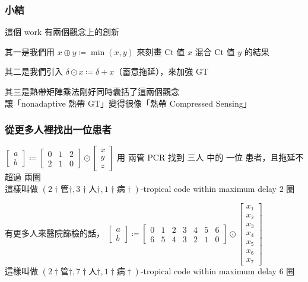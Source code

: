 \documentclass[12pt,aspectratio=1610]{beamer}
\def\pp{\pause\par}
\begin{document}
\begin{frame}\frametitle{小結}
	這個 work 有兩個觀念上的創新
	\pp
	其一是我們用 $x ⊕ y ≔ \min(x, y)$ 來刻畫 Ct 值 $x$ 混合 Ct 值 $y$ 的結果 %
	\pp
	其二是我們引入 $δ ⊙ x ≔ δ + x$（蓄意拖延），來加強 GT %
	\pp
	其三是熱帶矩陣乘法剛好同時囊括了這兩個觀念 \\
	讓「nonadaptive 熱帶 GT」變得很像「熱帶 Compressed Sensing」
\end{frame}

\begin{frame}\frametitle{從更多人裡找出一位患者}
	$\begin{bmatrix}
		a \\ b
	\end{bmatrix}
	≔
	\begin{bmatrix}
		0 & 1 & 2 \\
		2 & 1 & 0
	\end{bmatrix}
	⊙
	\begin{bmatrix}
		x \\ y \\ z
	\end{bmatrix}$
	用 \alert{兩管} PCR 找到 \alert{三人} 中的 \alert{一位} 患者，且拖延不超過 \alert{兩圈} \\
	這樣叫做 $(2†管†, 3†人†, 1†病†)$-tropical code within maximum delay $2$ 圈
	\pp
	有更多人來醫院篩檢的話，
	$\begin{bmatrix}
		a \\ b
	\end{bmatrix}
	≔
	\begin{bmatrix}
		0 & 1 & 2 & 3 & 4 & 5 & 6\\
		6 & 5 & 4 & 3 & 2 & 1 & 0
	\end{bmatrix}
	⊙
	\begin{bmatrix}
		x₁ \\ x₂ \\ x₃ \\ x₄ \\ x₅ \\x₆ \\ x₇
	\end{bmatrix}$ \\
	這樣叫做 $(2†管†, 7†人†, 1†病†)$-tropical code within maximum delay $6$ 圈
\end{frame}
\end{document}

